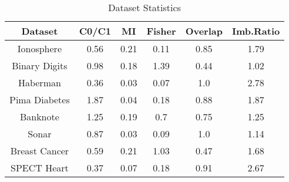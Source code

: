 \begin{table}[htbp]
\caption{Dataset Statistics}
\begin{center}
\begin{tabular}{|c|c|c|c|c|c|}
\hline
\textbf{Dataset} & \textbf{C0/C1} & \textbf{MI} & \textbf{Fisher} & \textbf{Overlap} & \textbf{Imb.Ratio} \\ \hline
Ionosphere & 0.56 & 0.21 & 0.11 & 0.85 & 1.79 \\ \hline
Binary Digits & 0.98 & 0.18 & 1.39 & 0.44 & 1.02 \\ \hline
Haberman & 0.36 & 0.03 & 0.07 & 1.0 & 2.78 \\ \hline
Pima Diabetes & 1.87 & 0.04 & 0.18 & 0.88 & 1.87 \\ \hline
Banknote & 1.25 & 0.19 & 0.7 & 0.75 & 1.25 \\ \hline
Sonar & 0.87 & 0.03 & 0.09 & 1.0 & 1.14 \\ \hline
Breast Cancer & 0.59 & 0.21 & 1.03 & 0.47 & 1.68 \\ \hline
SPECT Heart & 0.37 & 0.07 & 0.18 & 0.91 & 2.67 \\ \hline
\end{tabular}
\label{tab:statistics}
\end{center}
\end{table}
